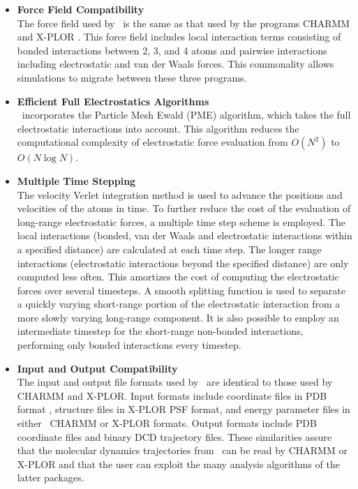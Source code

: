 \begin{itemize}

\item{\bf Force Field Compatibility}\\
The force field used by \NAMD\ is the same as that used by the programs 
CHARMM  and X-PLOR 
.  This force field includes local 
interaction terms consisting of bonded interactions between 2, 3, and 4 atoms 
and pairwise interactions including electrostatic and van der Waals forces.
This commonality allows simulations to migrate between these three programs.

\item{\bf Efficient Full Electrostatics Algorithms}\\
\NAMD\ incorporates the Particle Mesh Ewald (PME) algorithm,
which takes the full electrostatic interactions into account.
This algorithm reduces the computational complexity of electrostatic
force evaluation from $O(N^2)$ to $O(N \log N)$.

\item{\bf Multiple Time Stepping}\\
The velocity Verlet integration method
is used to advance the positions and velocities of the atoms in time.
To further reduce the cost of the evaluation of 
long-range electrostatic forces, 
a multiple time step scheme is employed.  The local
interactions (bonded, van der Waals and electrostatic interactions within a
specified distance) are calculated at each time step.  The longer range
interactions (electrostatic interactions beyond the specified distance) are
only computed less often.
This amortizes the cost of computing the electrostatic forces over several timesteps.
A smooth splitting function is used to separate a quickly varying short-range portion of the electrostatic interaction from a more slowly varying long-range component.
It is also possible to employ an intermediate timestep for the short-range non-bonded interactions, performing only bonded interactions every timestep.


\item{\bf Input and Output Compatibility}\\
The input and output file formats used by \NAMD\ are identical to those
used by CHARMM and X-PLOR.  Input formats include coordinate files in PDB format
, structure files in X-PLOR PSF format, 
and energy parameter files in either ~CHARMM or X-PLOR formats.
Output formats include PDB coordinate files and binary DCD trajectory files.
These similarities assure that the molecular dynamics trajectories from \NAMD\ 
can be read by CHARMM or X-PLOR and that the user can exploit the many 
analysis algorithms of the latter packages.


\end{itemize}
